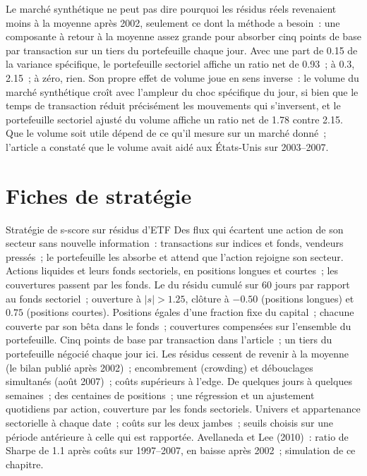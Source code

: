 Le marché synthétique ne peut pas dire pourquoi les résidus réels revenaient moins à la moyenne après 2002, seulement ce dont la méthode a besoin~: une composante à retour à la moyenne assez grande pour
absorber cinq points de base par transaction sur un tiers du portefeuille chaque jour. Avec une part de 0.15 de la variance spécifique, le portefeuille sectoriel affiche un ratio net de 0.93~; à 0.3, 2.15~; à zéro, rien.
Son propre effet de volume joue en sens inverse~: le volume du marché synthétique croît avec l'ampleur du choc spécifique du jour, si bien que le temps de transaction réduit précisément les
mouvements qui s'inversent, et le portefeuille sectoriel ajusté du volume affiche un ratio net de 1.78 contre 2.15. Que le volume soit utile dépend de ce qu'il mesure sur un marché donné~; l'article
a constaté que le volume avait aidé aux États-Unis sur 2003--2007.

\section{Fiches de stratégie}

\begin{strategyfile}{Stratégie de s-score sur résidus d'ETF}\label{strat:s1:residual-and-principal-component-stat-arb:etf}
 Des flux qui écartent une action de son secteur sans nouvelle information~: transactions sur indices et fonds, vendeurs pressés~; le portefeuille les absorbe et
attend que l'action rejoigne son secteur.
 Actions liquides et leurs fonds sectoriels, en positions longues et courtes~; les couvertures passent par les fonds.
 Le  du résidu cumulé sur 60 jours par rapport au fonds sectoriel~; ouverture à $|s| > 1.25$, clôture à $-0.50$ (positions longues) et $0.75$ (positions courtes).
 Positions égales d'une fraction fixe du capital~; chacune couverte par son bêta dans le fonds~; couvertures compensées sur l'ensemble du portefeuille.
 Cinq points de base par transaction dans l'article~; un tiers du portefeuille négocié chaque jour ici.
 Les résidus cessent de revenir à la moyenne (le bilan publié après 2002)~; encombrement (crowding) et débouclages simultanés (août 2007)~; coûts supérieurs à l'edge.
 De quelques jours à quelques semaines~; des centaines de positions~; une régression et un ajustement quotidiens par action, couverture par les fonds sectoriels.
 Univers et appartenance sectorielle à chaque date~; coûts sur les deux jambes~; seuils choisis sur une période antérieure à celle qui est rapportée.
 Avellaneda et Lee (2010)~: ratio de Sharpe de 1.1 après coûts sur 1997--2007, en baisse après 2002~; simulation de ce chapitre.
\end{strategyfile}


